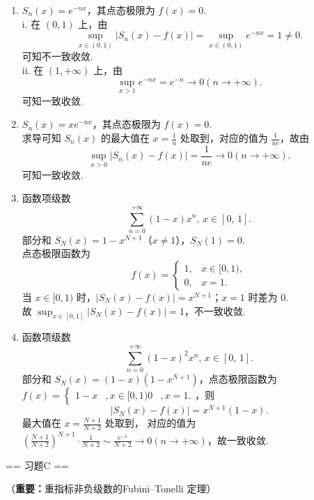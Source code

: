 \begin{solution}
    \begin{enumerate}
    \item  
    $S_n(x)=e^{-nx}$，其点态极限为 $f(x)=0$.\\
    i. 在 $(0,1)$ 上，由
    \[
    \sup_{x\in(0,1)} |S_n(x)-f(x)| = \sup_{x\in(0,1)} e^{-nx} = 1\neq 0.
    \]
    可知不一致收敛.\\
    ii. 在 $(1,+\infty)$ 上，由
    \[
    \sup_{x>1} e^{-nx} = e^{-n} \to 0(n\to+\infty).
    \]
    可知一致收敛. 

    \item 
    $S_n(x)=xe^{-nx}$，其点态极限为 $f(x)=0$.\\
    求导可知 $S_n(x)$ 的最大值在 $\displaystyle x=\frac{1}{n}$ 处取到，对应的值为 $\displaystyle  \frac{1}{n e}$，故由
    \[
    \sup_{x>0} |S_n(x)-f(x)| = \frac{1}{n e} \to 0(n\to+\infty).
    \]
    可知一致收敛.

    \item 
    函数项级数
    \[
    \sum_{n=0}^{+\infty}(1-x)x^n,\,x\in[0,\,1].
    \]
    部分和 $S_N(x) = 1 - x^{N+1}$（$x \neq 1$），$S_N(1)=0$.\\
    点态极限函数为
    \[
    f(x) = 
    \begin{cases}
        1, & x \in [0,1), \\
        0, & x=1.
    \end{cases}
    \]
    当 $x \in [0,1)$ 时，$|S_N(x)-f(x)| = x^{N+1}$；$x=1$ 时差为 $0$.\\
    故 $\displaystyle \sup_{x\in[0,1]} |S_N(x)-f(x)| = 1$，不一致收敛.

    \item 
    函数项级数
    \[
    \sum_{n=0}^{+\infty}(1-x)^2x^n,\,x\in[0,\,1].
    \]
    部分和 $S_N(x) = (1-x)(1-x^{N+1})$，点态极限函数为 
    $f(x)=
    \begin{cases}
        1-x &, x \in [0,1)
        0 &, x=1.
    \end{cases}$，则
    \[
    |S_N(x)-f(x)| = x^{N+1}(1-x).
    \]
    最大值在 $\displaystyle x=\frac{N+1}{N+2}$ 处取到，
    对应的值为 $\displaystyle \left(\frac{N+1}{N+2}\right)^{N+1} \cdot \frac{1}{N+2} \sim \frac{e^{-1}}{N+2} \to 0(n\to+\infty)$，故一致收敛.    
    \end{enumerate}
\end{solution}

== 习题C ==

（\textbf{重要：}重指标非负级数的Fubini–Tonelli 定理）

